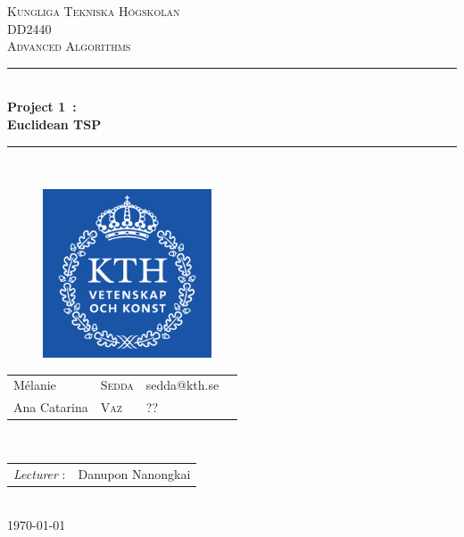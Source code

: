 \documentclass{article}
\begin{document}
\begin{titlepage}
\newcommand{\HRule}{\rule{\linewidth}{0.5mm}} %
\centering %
 
\null
\vspace{2cm}
\textsc{\Large Kungliga Tekniska Högskolan}\\[1cm] %
\textsc{\large DD2440 \\[0.3cm] Advanced Algorithms}\\[0.5cm] %

\vspace{0.5cm}
\HRule \\[0.4cm]
{ \LARGE \bfseries Project 1~: \\ [0.2cm]
\large Euclidean TSP} \\[0.4cm]

\HRule \\[0.5cm]
 
\vspace{1cm}
\begin{figure}[!h]
	\begin{center}
		\includegraphics[width=5cm]{images/kth.png}
	\end{center}
\end{figure}


\vspace{2cm}
\large 
{\begin{tabular}{llll}
 Mélanie & \textsc{Sedda} & sedda@kth.se\\
 Ana Catarina & \textsc{Vaz} & ?? \\
\end{tabular}}
\\[1cm]

\normalsize
{\begin{tabular}{ll}
\textit{Lecturer} : & Danupon Nanongkai\\
\end{tabular}}
\\[1cm]


{\normalsize \today}\\[3cm] %

\newpage

\end{titlepage}
\end{document}
